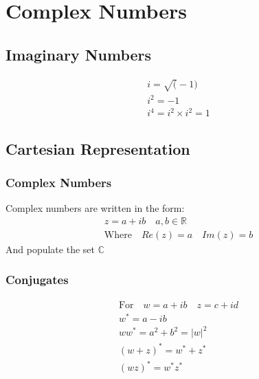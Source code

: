 \documentclass[../main]{subfiles}
\begin{document}
\section{Complex Numbers}

\subsection{Imaginary Numbers}
	\begin{equation*} \begin{gathered}
		i = \sqrt(-1) \\
		i^2 = -1 \\
		i^4 = i^2 \times i^2 = 1
	\end{gathered} \end{equation*}

\subsection{Cartesian Representation}

	\subsubsection{Complex Numbers}
	Complex numbers are written in the form:
	\begin{equation*} \begin{gathered}
		z = a + ib \quad a,b \in \mathbb{R} \\
		\text{Where} \quad Re(z) = a \quad Im(z) = b
	\end{gathered} \end{equation*}
	And populate the set \(\mathbb{C}\)
	\subsubsection{Conjugates}
	\begin{equation*} \begin{gathered}
		\text{For} \quad w = a+ib \quad z = c+id \\
		w^* = a - ib \\
		ww^* = a^2 + b^2 = |w|^2\\
		(w+z)^* = w^* + z^* \\
		(wz)^* = w^*z^* \\
	\end{gathered} \end{equation*}
\end{document}
